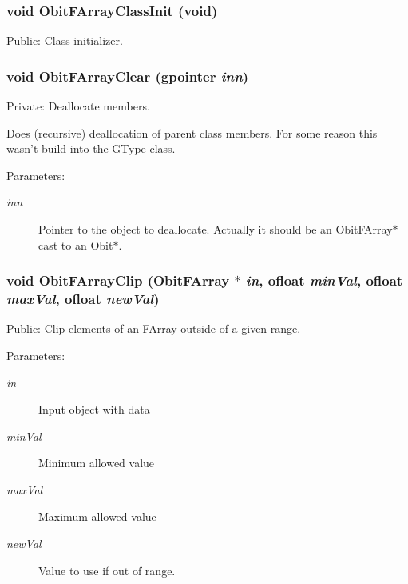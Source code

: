 \subsubsection{\setlength{\rightskip}{0pt plus 5cm}void Obit\-FArray\-Class\-Init (void)}\label{ObitFArray_8c_a68}


Public: Class initializer. 

\subsubsection{\setlength{\rightskip}{0pt plus 5cm}void Obit\-FArray\-Clear (gpointer {\em inn})}\label{ObitFArray_8c_a5}


Private: Deallocate members. 

Does (recursive) deallocation of parent class members. For some reason this wasn't build into the GType class. \begin{Desc}
\item[Parameters:]
\begin{description}
\item[{\em inn}]Pointer to the object to deallocate. Actually it should be an Obit\-FArray$\ast$ cast to an Obit$\ast$. \end{description}
\end{Desc}
\subsubsection{\setlength{\rightskip}{0pt plus 5cm}void Obit\-FArray\-Clip ({\bf Obit\-FArray} $\ast$ {\em in}, {\bf ofloat} {\em min\-Val}, {\bf ofloat} {\em max\-Val}, {\bf ofloat} {\em new\-Val})}\label{ObitFArray_8c_a45}


Public: Clip elements of an FArray outside of a given range. 

\begin{Desc}
\item[Parameters:]
\begin{description}
\item[{\em in}]Input object with data \item[{\em min\-Val}]Minimum allowed value \item[{\em max\-Val}]Maximum allowed value \item[{\em new\-Val}]Value to use if out of range. \end{description}
\end{Desc}
